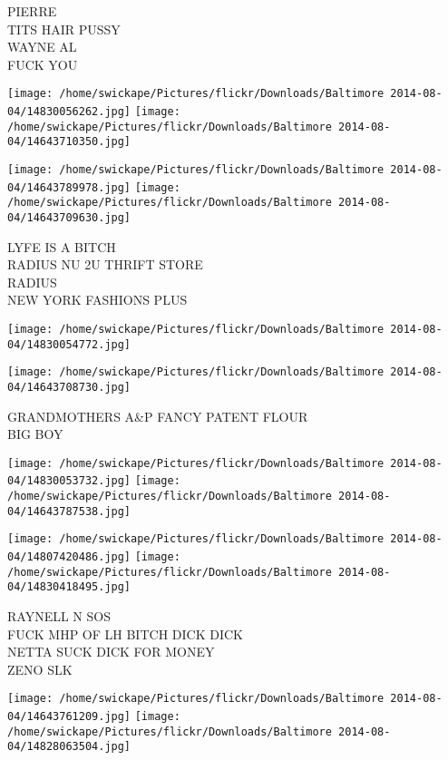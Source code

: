 \documentclass[10pt,letterpaper]{article}
\begin{document}
PIERRE\\
TITS HAIR PUSSY\\
WAYNE AL\\
FUCK YOU\\
\pagebreak

\texttt{[image: /home/swickape/Pictures/flickr/Downloads/Baltimore 2014-08-04/14830056262.jpg]}
\texttt{[image: /home/swickape/Pictures/flickr/Downloads/Baltimore 2014-08-04/14643710350.jpg]}

\texttt{[image: /home/swickape/Pictures/flickr/Downloads/Baltimore 2014-08-04/14643789978.jpg]}
\texttt{[image: /home/swickape/Pictures/flickr/Downloads/Baltimore 2014-08-04/14643709630.jpg]}

LYFE IS A BITCH\\
RADIUS NU 2U THRIFT STORE\\
RADIUS\\
NEW YORK FASHIONS PLUS\\
\pagebreak

\texttt{[image: /home/swickape/Pictures/flickr/Downloads/Baltimore 2014-08-04/14830054772.jpg]}

\vspace{0.25in}
\texttt{[image: /home/swickape/Pictures/flickr/Downloads/Baltimore 2014-08-04/14643708730.jpg]}

GRANDMOTHERS A\&P FANCY PATENT FLOUR\\
BIG BOY\\
\pagebreak

\texttt{[image: /home/swickape/Pictures/flickr/Downloads/Baltimore 2014-08-04/14830053732.jpg]}
\texttt{[image: /home/swickape/Pictures/flickr/Downloads/Baltimore 2014-08-04/14643787538.jpg]}

\texttt{[image: /home/swickape/Pictures/flickr/Downloads/Baltimore 2014-08-04/14807420486.jpg]}
\texttt{[image: /home/swickape/Pictures/flickr/Downloads/Baltimore 2014-08-04/14830418495.jpg]}

RAYNELL N SOS\\
FUCK MHP OF LH BITCH DICK DICK\\
NETTA SUCK DICK FOR MONEY\\
ZENO SLK\\
\pagebreak

\texttt{[image: /home/swickape/Pictures/flickr/Downloads/Baltimore 2014-08-04/14643761209.jpg]}
\texttt{[image: /home/swickape/Pictures/flickr/Downloads/Baltimore 2014-08-04/14828063504.jpg]}
\end{document}
